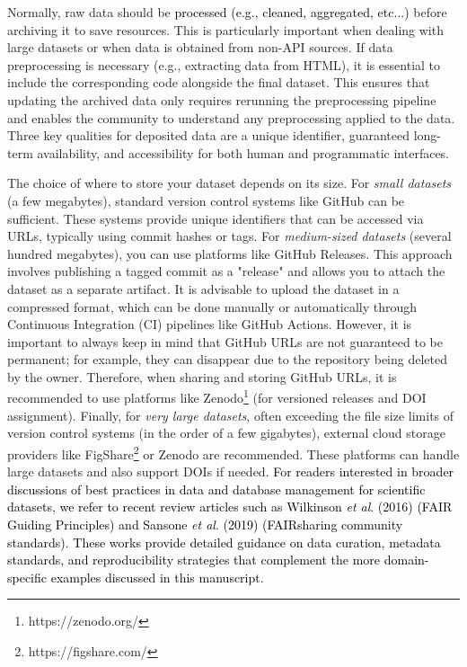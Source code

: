 \documentclass[9pt,lessons, pubversion]{livecoms}
\newcommand{\revision}[1]{\textcolor{black}{#1}}
\begin{document}
Normally, raw data should be \revision{processed (e.g., cleaned, aggregated, etc...)} before archiving it to save resources. This is particularly important when dealing with large datasets or when data is obtained from non-API sources.
If data preprocessing is necessary (e.g., extracting data from HTML), it is essential to include the corresponding code alongside the final dataset. 
This ensures that updating the archived data only requires rerunning the preprocessing pipeline and enables the community to understand any preprocessing applied to the data. 
Three key qualities for deposited data are a unique identifier, guaranteed long-term availability, and accessibility for both human and programmatic interfaces.

The choice of where to store your dataset depends on its size. 
For \textit{small datasets} (a few megabytes), standard version control systems like GitHub can be sufficient. 
These systems provide unique identifiers that can be accessed via URLs, typically using commit hashes or tags. 
For \textit{medium-sized datasets} (several hundred megabytes), you can use platforms like GitHub Releases. This approach involves publishing a tagged commit as a "release" and allows you to attach the dataset as a separate artifact. It is advisable to upload the dataset in a compressed format, which can be done manually or automatically through Continuous Integration (CI) pipelines like GitHub Actions.
However, it is important to always keep in mind that GitHub URLs are not guaranteed to be permanent; for example, they can disappear due to the repository being deleted by the owner. Therefore, when sharing and storing GitHub URLs, it is recommended to use platforms like Zenodo\footnote{https://zenodo.org/}  (for versioned releases and DOI assignment). 
    Finally, for \textit{very large datasets}, often exceeding the file size limits of version control systems (in the order of a few gigabytes), external cloud storage providers like FigShare\footnote{https://figshare.com/} or Zenodo are recommended. These platforms can handle large datasets and also support DOIs if needed. \revision{For readers interested in broader discussions of best practices in data and database management for scientific datasets, we refer to recent review articles such as Wilkinson \textit{et al}. (2016)  \cite{wilkinson2016fair} (FAIR Guiding Principles) and Sansone \textit{et al}. (2019) \cite{sansone2019fairsharing} (FAIRsharing community standards). These works provide detailed guidance on data curation, metadata standards, and reproducibility strategies that complement the more domain-specific examples discussed in this manuscript. }
\end{document}
